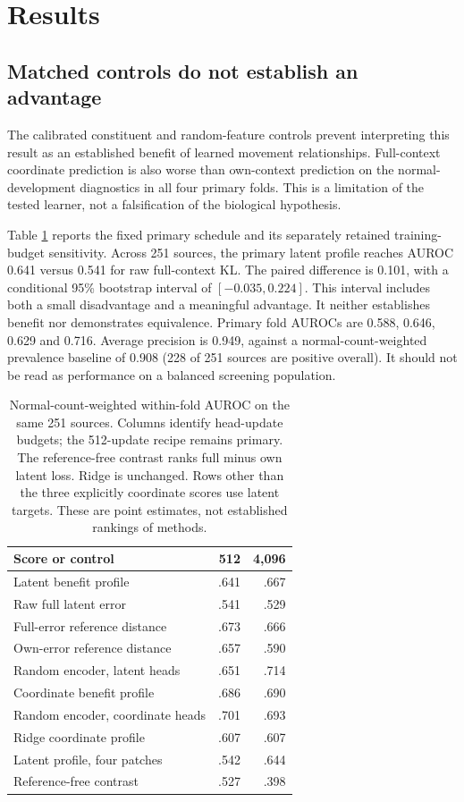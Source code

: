 \documentclass[letterpaper]{article}
\begin{document}
\section{Results}

\subsection{Matched controls do not establish an advantage}

The calibrated constituent and random-feature controls prevent interpreting this result as an established benefit of learned movement relationships. Full-context coordinate prediction is also worse than own-context prediction on the normal-development diagnostics in all four primary folds. This is a limitation of the tested learner, not a falsification of the biological hypothesis.

Table \ref{tab:ranking} reports the fixed primary schedule and its separately retained training-budget sensitivity. Across 251 sources, the primary latent profile reaches AUROC 0.641 versus 0.541 for raw full-context KL. The paired difference is 0.101, with a conditional 95\% bootstrap interval of \([-0.035, 0.224]\). This interval includes both a small disadvantage and a meaningful advantage. It neither establishes benefit nor demonstrates equivalence. Primary fold AUROCs are 0.588, 0.646, 0.629 and 0.716. Average precision is 0.949, against a normal-count-weighted prevalence baseline of 0.908 (228 of 251 sources are positive overall). It should not be read as performance on a balanced screening population.

\begin{table}[t]
\centering
\begin{tabular}{lrr}
\toprule
Score or control & 512 & 4,096 \\
\midrule
Latent benefit profile & .641 & .667 \\
Raw full latent error & .541 & .529 \\
Full-error reference distance & .673 & .666 \\
Own-error reference distance & .657 & .590 \\
Random encoder, latent heads & .651 & .714 \\
Coordinate benefit profile & .686 & .690 \\
Random encoder, coordinate heads & .701 & .693 \\
Ridge coordinate profile & .607 & .607 \\
Latent profile, four patches & .542 & .644 \\
Reference-free contrast & .527 & .398 \\
\bottomrule
\end{tabular}
\caption{Normal-count-weighted within-fold AUROC on the same 251 sources. Columns identify head-update budgets; the 512-update recipe remains primary. The reference-free contrast ranks full minus own latent loss. Ridge is unchanged. Rows other than the three explicitly coordinate scores use latent targets. These are point estimates, not established rankings of methods.}
\label{tab:ranking}
\end{table}
\end{document}
